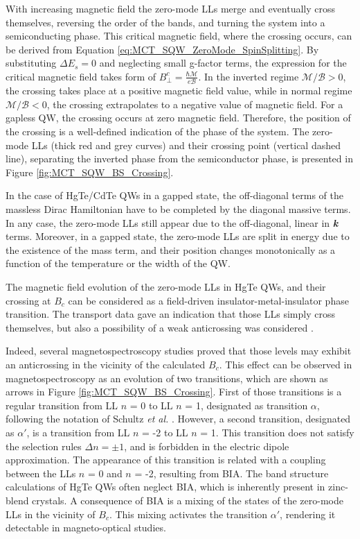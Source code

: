\documentclass[titlepage,a4paper]{book}
\begin{document}
With increasing magnetic field the zero-mode LLs merge and eventually cross themselves, reversing the order of the bands, and turning the system into a semiconducting phase. This critical magnetic field, where the crossing occurs, can be derived from Equation \ref{eq:MCT_SQW_ZeroMode_SpinSplitting}. By substituting $\Delta E_s = 0$ and neglecting small g-factor terms, the expression for the critical magnetic field takes form of $B^c_{\perp} = \frac{\hbar \mathcal{M}}{e\mathcal{B}}$. In the inverted regime $\mathcal{M}/\mathcal{B} > 0$, the crossing takes place at a positive magnetic field value, while in normal regime $\mathcal{M}/\mathcal{B} < 0$, the crossing extrapolates to a negative value of magnetic field. For a gapless QW, the crossing occurs at zero magnetic field. Therefore, the position of the crossing is a well-defined indication of the phase of the system. The zero-mode LLs (thick red and grey curves) and their crossing point (vertical dashed line), separating the inverted phase from the semiconductor phase, is presented in Figure \ref{fig:MCT_SQW_BS_Crossing}. 

In the case of HgTe/CdTe QWs in a gapped state, the off-diagonal terms of the massless Dirac Hamiltonian have to be completed by the diagonal massive terms. In any case, the zero-mode LLs still appear due to the off-diagonal, linear in \textbf{\textit{k}} terms. Moreover, in a gapped state, the zero-mode LLs are split in energy due to the existence of the mass term, and their position changes monotonically as a function of the temperature or the width of the QW.

The magnetic field evolution of the zero-mode LLs in HgTe QWs, and their crossing at $B_c$ can be considered as a field-driven insulator-metal-insulator phase transition. The transport data \cite{Konig_Topology} gave an indication that those LLs simply cross themselves, but also a possibility of a weak anticrossing was considered \cite{Konig_MCT_SQW}.

Indeed, several magnetospectroscopy studies \cite{Orlita_MCT_QW}\cite{Zholudev_MCT_QW} proved that those levels may exhibit an anticrossing in the vicinity of the calculated $B_c$. This effect can be observed in magnetospectroscopy as an evolution of two transitions, which are shown as arrows in Figure \ref{fig:MCT_SQW_BS_Crossing}. First of those transitions is a regular transition from LL $n$ = 0 to LL $n$ = 1, designated as transition $\alpha$, following the notation of Schultz \textit{et al.} \cite{Schultz}. However, a second transition, designated as $\alpha'$, is a transition from LL $n$ = -2 to LL $n$ = 1. This transition does not satisfy the selection rules $\Delta n = \pm 1$, and is forbidden in the electric dipole approximation. The appearance of this transition is related with a coupling between the LLs $n$ = 0 and $n$ = -2, resulting from BIA. The band structure calculations of HgTe QWs often neglect BIA, which is inherently present in zinc-blend crystals. A consequence of BIA is a mixing of the states of the zero-mode LLs in the vicinity of $B_c$. This mixing activates the transition $\alpha'$, rendering it detectable in magneto-optical studies.
\end{document}
